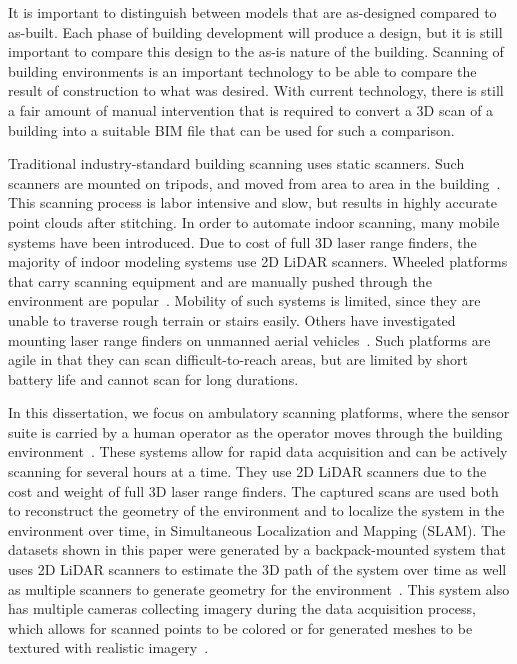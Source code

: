 \documentclass[12pt,onecolumn,oneside]{book}
\begin{document}
It is important to distinguish between models that are as-designed compared to as-built.  Each phase of building development will produce a design, but it is still important to compare this design to the as-is nature of the building.  Scanning of building environments is an important technology to be able to compare the result of construction to what was desired.  With current technology, there is still a fair amount of manual intervention that is required to convert a 3D scan of a building into a suitable BIM file that can be used for such a comparison.

Traditional industry-standard building scanning uses static scanners.  Such scanners are mounted on tripods, and moved from area to area in the building~\cite{RoomSegmentation,HistWallRecon,BasicPlaneFit}. This scanning process is labor intensive and slow, but results in highly accurate point clouds after stitching.  In order to automate indoor scanning, many mobile systems have been introduced. Due to cost of full 3D laser range finders, the majority of indoor modeling systems use 2D LiDAR scanners.  Wheeled platforms that carry scanning equipment and are manually pushed through the environment are popular~\cite{Carving, ProbabilisticRobotics}.  Mobility of such systems is limited, since they are unable to traverse rough terrain or stairs easily.  Others have investigated mounting laser range finders on unmanned aerial vehicles~\cite{Quadrotor,QuadrotorMIT,SpectralClustering}.  Such platforms are agile in that they can scan difficult-to-reach areas, but are limited by short battery life and cannot scan for long durations.

In this dissertation, we focus on ambulatory scanning platforms, where the sensor suite is carried by a human operator as the operator moves through the building environment~\cite{Sweep,MITBackpack,VillageHeritage}.  These systems allow for rapid data acquisition and can be actively scanning for several hours at a time.  They use 2D LiDAR scanners due to the cost and weight of full 3D laser range finders.  The captured scans are used both to reconstruct the geometry of the environment and to localize the system in the environment over time, in Simultaneous Localization and Mapping (SLAM).  The datasets shown in this paper were generated by a backpack-mounted system that uses 2D LiDAR scanners to estimate the 3D path of the system over time as well as multiple scanners to generate geometry for the environment~\cite{liu2010indoor,Backpack,Localization,NickJournal}.  This system also has multiple cameras collecting imagery during the data acquisition process, which allows for scanned points to be colored or for generated meshes to be textured with realistic imagery~\cite{Cheng14}. 
\end{document}
